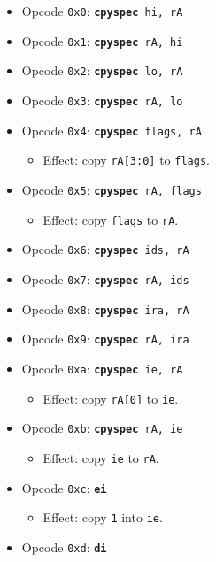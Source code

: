 \documentclass{article}
\begin{document}
	\singlespacing
	\begin{itemize}
		\item Opcode \texttt{0x0}:
			\texttt{\textbf{cpyspec} hi, rA}
		\item Opcode \texttt{0x1}:
			\texttt{\textbf{cpyspec} rA, hi}
		\item Opcode \texttt{0x2}:
			\texttt{\textbf{cpyspec} lo, rA}
		\item Opcode \texttt{0x3}:
			\texttt{\textbf{cpyspec} rA, lo}
		\item Opcode \texttt{0x4}:
			\texttt{\textbf{cpyspec} flags, rA}
		\begin{itemize}
			\item Effect:  copy \texttt{rA[3:0]} to \texttt{flags}.
		\end{itemize}
		\item Opcode \texttt{0x5}:
			\texttt{\textbf{cpyspec} rA, flags}
		\begin{itemize}
			\item Effect:  copy \texttt{flags} to \texttt{rA}.
		\end{itemize}
		\item Opcode \texttt{0x6}:
			\texttt{\textbf{cpyspec} ids, rA}
		\item Opcode \texttt{0x7}:
			\texttt{\textbf{cpyspec} rA, ids}
		\item Opcode \texttt{0x8}:
			\texttt{\textbf{cpyspec} ira, rA}
		\item Opcode \texttt{0x9}:
			\texttt{\textbf{cpyspec} rA, ira}
		\item Opcode \texttt{0xa}:
			\texttt{\textbf{cpyspec} ie, rA}
		\begin{itemize}
			\item Effect:  copy \texttt{rA[0]} to \texttt{ie}.
		\end{itemize}
		\item Opcode \texttt{0xb}:
			\texttt{\textbf{cpyspec} rA, ie}
		\begin{itemize}
			\item Effect:  copy \texttt{ie} to \texttt{rA}.
		\end{itemize}
		\item Opcode \texttt{0xc}:
			\texttt{\textbf{ei}}
		\begin{itemize}
			\item Effect:  copy \texttt{1} into \texttt{ie}.
		\end{itemize}
		\item Opcode \texttt{0xd}:
			\texttt{\textbf{di}}
		\begin{itemize}

\end{itemize}
\end{itemize}
\end{document}

